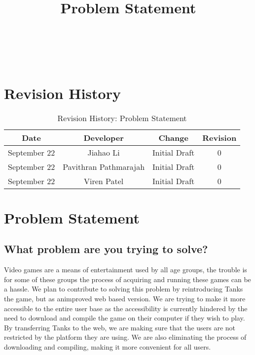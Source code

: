 \documentclass{article}
\begin{document}

\newpage

\title{Problem Statement}
\section*{\\\\Revision History}

\begin{table}[h!]
  \centering
  \caption{Revision History: Problem Statement}
  \label{tab:table1}
  \begin{tabular}{cccc}
	\toprule
	Date &  Developer & Change & Revision\\
	\midrule
	September 22&Jiahao Li &Initial Draft &0\\
	September 22&Pavithran Pathmarajah &Initial Draft &0\\
	September 22&Viren Patel  &Initial Draft &0\\
	\bottomrule
  \end{tabular}
\end{table}

\newpage

\section*{Problem Statement}

\subsection{What problem are you trying to solve?}
Video games are a means of entertainment used by all age groups, the trouble is for some of these groups the process of acquiring and running these games can be a hassle. We                                plan to contribute to solving this problem by reintroducing Tanks the game, but as animproved web based version. We are trying to make it more accessible to the entire user base as the                                     accessibility is currently hindered by the need to download and compile the game on their computer if they wish to play. By transferring Tanks to the web, we are making sure that the                                     users are not restricted by the platform they are using. We are also eliminating the process of downloading and compiling, making it more convenient for all users. 
\end{document}
